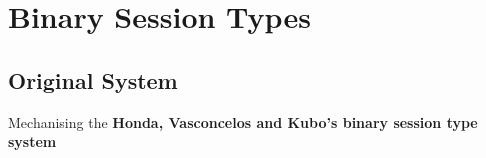 
\section{Binary Session Types}

\subsection{Original System}

\begin{frame}
\begin{sticky}
\Large
Mechanising the \textbf{Honda, Vasconcelos and Kubo's binary session type
system~}
\end{sticky}
\small
{}
\end{frame}

